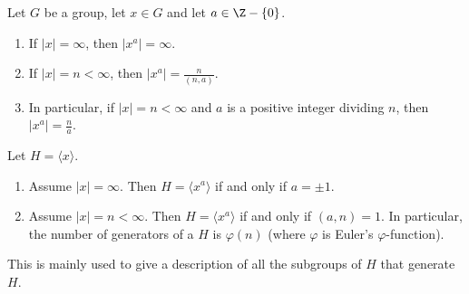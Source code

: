 \begin{prop}[(5)]
Let \( G  \) be a group, let \( x \in G  \) and let \( a \in \Z - \{  0  \}  \).
\begin{enumerate}
    \item[(1)] If \( | x  |  = \infty   \), then \( | x^{a} |  = \infty  \).
    \item[(2)] If \( | x  |  =  n < \infty  \), then \( | x^{a} |  = \displaystyle \frac{ n  }{ (n,a) }  \).
    \item[(3)] In particular, if \( | x  |  = n < \infty  \) and \( a  \) is a positive integer dividing \( n \), then \( | x^{a} |  = \frac{ n }{ a }  \).
\end{enumerate}
\end{prop}

\begin{prop}[(6)]
   Let \( H = \langle x  \rangle \). 
    \begin{enumerate}
        \item[(1)] Assume \( | x  |  = \infty  \). Then \( H = \langle x^{a} \rangle  \) if and only if \( a = \pm 1  \).
        \item[(2)] Assume \( | x  |  = n < \infty  \). Then \( H= \langle x^{a} \rangle\) if and only if \( (a,n) = 1   \). In particular, the number of generators of a \( H  \) is \( \varphi(n) \) (where \( \varphi  \) is Euler's \( \varphi \)-function).
    \end{enumerate}
\end{prop}

This is mainly used to give a description of all the subgroups of \( H  \) that generate \( H  \).

